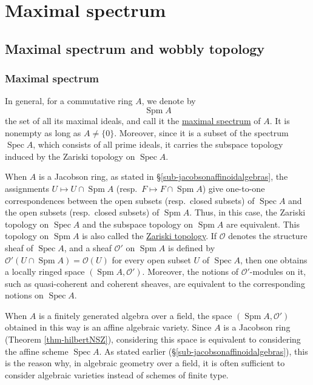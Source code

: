 \documentclass[a4paper,12pt, dvipdfmx]{jsbook}
\def\O{\mathscr{O}}
\def\Spec{\mathop{\mathrm{Spec}}\nolimits}
\def\Spm{\mathop{\mathrm{Spm}}\nolimits}
\theoremstyle{plain}
\theoremstyle{definition}
\newcounter{chushaku}
\begin{document}
\setcounter{chushaku}{0}
\chapter{Maximal spectrum}\label{CH-REDUCTIONMAP}
\section{Maximal spectrum and wobbly topology}\label{sec-maximalspectrums}
\subsection{Maximal spectrum}\label{sub-maximalspectrums}
In general, for a commutative ring $A$, we denote by
$$
\Spm A
$$
the set of all its maximal ideals, and call it the \underline{maximal spectrum} of $A$.
It is nonempty as long as $A\neq\{0\}$.
Moreover, since it is a subset of the spectrum $\Spec A$, which consists of all prime ideals, it carries the subspace topology induced by the Zariski topology on $\Spec A$.

When $A$ is a Jacobson ring, as stated in \S\ref{sub-jacobsonaffinoidalgebras}, the assignments $U\mapsto U\cap\Spm A$ (resp.\ $F\mapsto F\cap\Spm A$) give one-to-one correspondences between the open subsets (resp.\ closed subsets) of $\Spec A$ and the open subsets (resp.\ closed subsets) of $\Spm A$.
Thus, in this case, the Zariski topology on $\Spec A$ and the subspace topology on $\Spm A$ are equivalent.
This topology on $\Spm A$ is also called the \underline{Zariski topology}.
If $\O$ denotes the structure sheaf of $\Spec A$, and a sheaf $\O'$ on $\Spm A$ is defined by $\O'(U\cap\Spm A)=\O(U)$ for every open subset $U$ of $\Spec A$, then one obtains a locally ringed space $(\Spm A,\O')$. Moreover, the notions of $\O'$-modules on it, such as quasi-coherent and coherent sheaves, are equivalent to the corresponding notions on $\Spec A$.

When $A$ is a finitely generated algebra over a field, the space $(\Spm A,\O')$ obtained in this way is an affine algebraic variety. Since $A$ is a Jacobson ring (Theorem \ref{thm-hilbertNSZ}), considering this space is equivalent to considering the affine scheme $\Spec A$.
As stated earlier (\S\ref{sub-jacobsonaffinoidalgebras}), this is the reason why, in algebraic geometry over a field, it is often sufficient to consider algebraic varieties instead of schemes of finite type.
\end{document}
